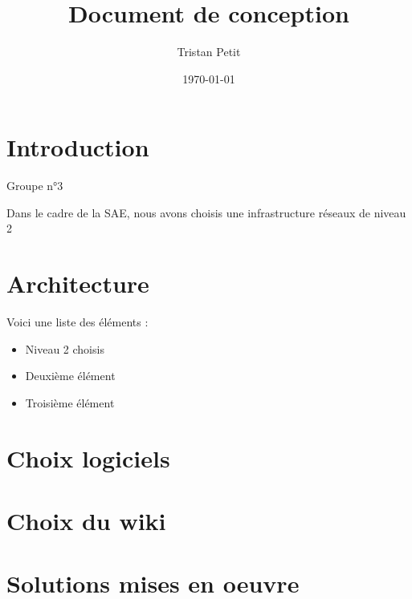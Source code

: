 \documentclass{article}
\begin{document}
\title{Document de conception}
\author{Tristan Petit}
\date{\today}
\maketitle

\section{Introduction}
Groupe n°3

Dans le cadre de la SAE, nous avons choisis une infrastructure réseaux 
de niveau 2

\section{Architecture}
Voici une liste des éléments :
\begin{itemize}
    \item Niveau 2 choisis
    \item Deuxième élément
    \item Troisième élément
\end{itemize}

\section{Choix logiciels}


\section{Choix du wiki}


\section{Solutions mises en oeuvre}
\end{document}
